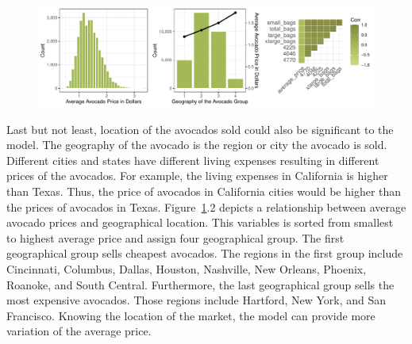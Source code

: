 \documentclass[11pt]{article}\usepackage[]{graphicx}\usepackage[]{color}
\makeatletter
\def\maxwidth{ %
  \ifdim\Gin@nat@width>\linewidth
    \linewidth
  \else
    \Gin@nat@width
  \fi
}
\makeatother
\begin{document}
\begin{figure}[h!] 
\begin{center}

\includegraphics[width=\maxwidth]{figure/unnamed-chunk-2-1} 

\caption{}
\label{explore2}
\end{center} 
\end{figure}

\noindent Last but not least, location of the avocados sold could also be significant to the model. The geography of the avocado is the region or city the avocado is sold. Different cities and states have different living expenses resulting in different prices of the avocados. For example, the living expenses in California is higher than Texas. Thus, the price of avocados in California cities would be higher than the prices of avocados in Texas. Figure~\ref{explore2}.2 depicts a relationship between average avocado prices and geographical location. This variables is sorted from smallest to highest average price and assign four geographical group. The first geographical group sells cheapest avocados. The regions in the first group include Cincinnati, Columbus, Dallas, Houston, Nashville, New Orleans, Phoenix, Roanoke, and South Central. Furthermore, the last geographical group sells the most expensive avocados. Those regions include Hartford, New York, and San Francisco. Knowing the location of the market, the model can provide more variation of the average price.         
\hfill \break
\end{document}
